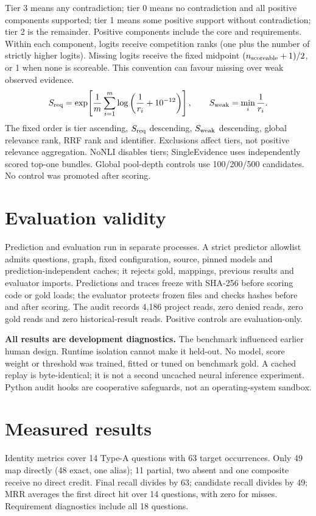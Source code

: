 \documentclass[11pt,a4paper]{article}
\begin{document}
Tier 3 means any contradiction; tier 0 means no contradiction and all positive components supported; tier 1 means some positive support without contradiction; tier 2 is the remainder. Positive components include the core and requirements. Within each component, logits receive competition ranks (one plus the number of strictly higher logits). Missing logits receive the fixed midpoint $(n_{\rm scoreable}+1)/2$, or 1 when none is scoreable. This convention can favour missing over weak observed evidence.
\[
S_{\rm req}=\exp\!\left[\frac1m\sum_{i=1}^{m}\log\left(\frac1{r_i}+10^{-12}\right)\right],
\qquad S_{\rm weak}=\min_i\frac1{r_i}.
\]
The fixed order is tier ascending, $S_{\rm req}$ descending, $S_{\rm weak}$ descending, global relevance rank, RRF rank and identifier. Exclusions affect tiers, not positive relevance aggregation. NoNLI disables tiers; SingleEvidence uses independently scored top-one bundles. Global pool-depth controls use 100/200/500 candidates. No control was promoted after scoring.

\section*{Evaluation validity}
Prediction and evaluation run in separate processes. A strict predictor allowlist admits questions, graph, fixed configuration, source, pinned models and prediction-independent caches; it rejects gold, mappings, previous results and evaluator imports. Predictions and traces freeze with SHA-256 before scoring code or gold loads; the evaluator protects frozen files and checks hashes before and after scoring. The audit records 4,186 project reads, zero denied reads, zero gold reads and zero historical-result reads. Positive controls are evaluation-only.

\textbf{All results are development diagnostics.} The benchmark influenced earlier human design. Runtime isolation cannot make it held-out. No model, score weight or threshold was trained, fitted or tuned on benchmark gold. A cached replay is byte-identical; it is not a second uncached neural inference experiment. Python audit hooks are cooperative safeguards, not an operating-system sandbox.

\newpage
\section*{Measured results}
Identity metrics cover 14 Type-A questions with 63 target occurrences. Only 49 map directly (48 exact, one alias); 11 partial, two absent and one composite receive no direct credit. Final recall divides by 63; candidate recall divides by 49; MRR averages the first direct hit over 14 questions, with zero for misses. Requirement diagnostics include all 18 questions.
\end{document}
